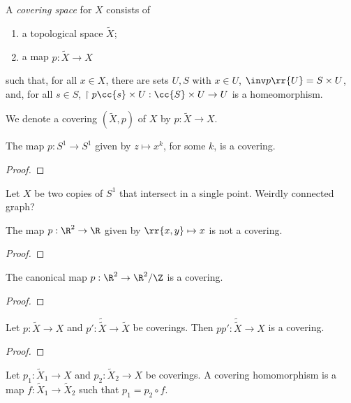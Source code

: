\documentclass{article}
\begin{document}
\begin{definition}
  A \emph{covering space} for $X$ consists of
  \begin{enumerate}
    \item a topological space $\tilde X$;
    \item a map $p:\tilde X\to X$
  \end{enumerate}
  such that, for all $x\in X$, there are sets $U,S$ with $x\in U$, $\inv p\rr{U}=S\times U$,
  and, for all $s\in S$, $\restriction{p}{\cc{s}\times U}:\cc{S}\times U\to U$ is a
  homeomorphism.
\end{definition}

\begin{notation}
  We denote a covering $(\tilde X,p)$ of $X$ by $p:\tilde X\to X$.
\end{notation}

\begin{example}
  The map $p:S^1\to S^1$ given by $z\mapsto x^k$, for some $k$, is a covering.
  \begin{proof}
    \missingproof
  \end{proof}
\end{example}

\begin{example}
  Let $X$ be two copies of $S^1$ that intersect in a single point. Weirdly connected
  graph?
\end{example}

\begin{example}
  The map $p:\R^2\to\R$ given by $\rr{x,y}\mapsto x$ is not a covering.
  \begin{proof}
    \missingproof
  \end{proof}
\end{example}

\begin{example}
  The canonical map $p:\R^2\to\R^2/\Z$ is a covering.
  \begin{proof}
    \missingproof
  \end{proof}
\end{example}

\begin{proposition}
  Let $p:\tilde X\to X$ and $p':\tilde{\tilde X}\to\tilde X$ be coverings.
  Then $pp':\tilde{\tilde{X}}\to X$ is a covering.
  \begin{proof}
    \missingproof
  \end{proof}
\end{proposition}

\begin{definition}
  Let $p_1:\tilde X_1\to X$ and $p_2:\tilde X_2\to X$ be coverings. A covering homomorphism
  is a map $f:\tilde X_1\to\tilde X_2$ such that $p_1 = p_2\circ f$.
\end{definition}
\end{document}
